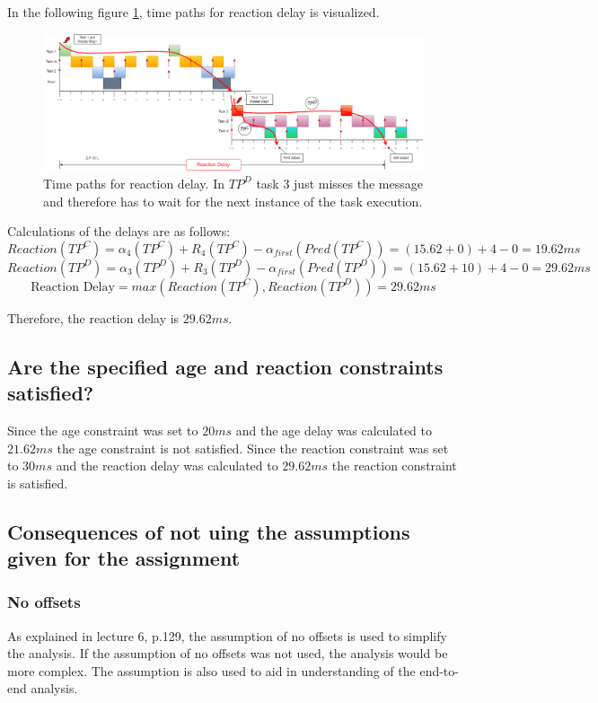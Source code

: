             In the following figure \ref{fig:reactiondelaypaths}, time paths for reaction delay is visualized.

            \begin{figure}[H]
                \centering
                \includegraphics[width=1\textwidth]{images/TimedPathReactionDelay.png}
                \caption{Time paths for reaction delay. In $TP^D$ task 3 just misses the message and therefore has to wait for the next instance of the task execution.}
                \label{fig:reactiondelaypaths} 
            \end{figure}

            Calculations of the delays are as follows: 
            $$Reaction(TP^C) = \alpha_4(TP^C) + R_4(TP^C) - \alpha_{first}(Pred(TP^C)) = (15.62+0) + 4 - 0 = 19.62ms$$
            $$Reaction(TP^D) = \alpha_3(TP^D) + R_3(TP^D) - \alpha_{first}(Pred(TP^D)) = (15.62+10) + 4 - 0 = 29.62ms$$
            $$\text{Reaction Delay} = max(Reaction(TP^C), Reaction(TP^D)) = 29.62ms$$

            Therefore, the reaction delay is $29.62ms$.

        \subsection*{\textbf{Are the specified age and reaction constraints satisfied?}}
            Since the age constraint was set to $20ms$ and the age delay was calculated to $21.62ms$ the age constraint is not satisfied. Since the reaction constraint was set to $30ms$ and the reaction delay was calculated to $29.62ms$ the reaction constraint is satisfied.

        \subsection*{\textbf{Consequences of not uing the assumptions given for the assignment}}
            \subsubsection*{No offsets}
                As explained in lecture 6, p.129, the assumption of no offsets is used to simplify the analysis. If the assumption of no offsets was not used, the analysis would be more complex. The assumption is also used to aid in understanding of the end-to-end analysis.


